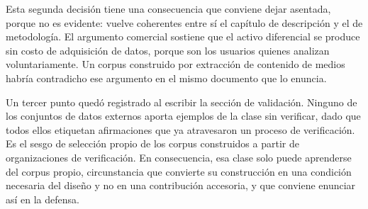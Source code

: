 Esta segunda decisión tiene una consecuencia que conviene dejar asentada, porque no es evidente: vuelve coherentes entre sí el capítulo de descripción y el de metodología. El argumento comercial sostiene que el activo diferencial se produce sin costo de adquisición de datos, porque son los usuarios quienes analizan voluntariamente. Un corpus construido por extracción de contenido de medios habría contradicho ese argumento en el mismo documento que lo enuncia.

Un tercer punto quedó registrado al escribir la sección de validación. Ninguno de los conjuntos de datos externos aporta ejemplos de la clase sin verificar, dado que todos ellos etiquetan afirmaciones que ya atravesaron un proceso de verificación. Es el sesgo de selección propio de los corpus construidos a partir de organizaciones de verificación. En consecuencia, esa clase solo puede aprenderse del corpus propio, circunstancia que convierte su construcción en una condición necesaria del diseño y no en una contribución accesoria, y que conviene enunciar así en la defensa.

\bigskip
